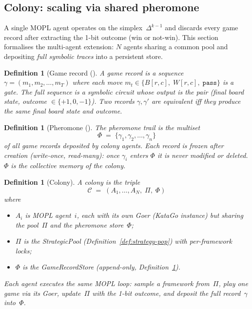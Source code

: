 \documentclass[11pt,a4paper]{article}
\newtheorem{definition}[theorem]{Definition}
\newcommand{\cC}{\mathcal{C}}
\begin{document}
\subsection{Colony: scaling via shared pheromone}\label{sec:colony}

A single MOPL agent operates on the simplex~$\Delta^{k-1}$
and discards every game record after extracting the 1-bit outcome
(win or not-win).
This section formalises the multi-agent extension:
$N$ agents sharing a common pool and depositing
\emph{full symbolic traces} into a persistent store.

\begin{definition}[Game record (\begin{CJK}{UTF8}{gbsn}棋谱\end{CJK})
  as symbolic circuit]\label{def:game-record}
A game record is a sequence
$\gamma = (m_1, m_2, \ldots, m_T)$
where each move $m_t \in \{B[r,c],\; W[r,c],\; \texttt{pass}\}$
is a \emph{gate}.
The full sequence is a symbolic circuit whose output
is the pair (final board state, outcome $\in \{+1, 0, -1\}$).
Two records $\gamma, \gamma'$ are \emph{equivalent} iff they
produce the same final board state and outcome.
\end{definition}

\begin{definition}[Pheromone
  (\begin{CJK}{UTF8}{gbsn}信息素\end{CJK})]\label{def:pheromone}
The pheromone trail is the multiset
\[
  \Phi \;=\; \{\gamma_1, \gamma_2, \ldots, \gamma_n\}
\]
of all game records deposited by colony agents.
Each record is \emph{frozen} after creation
(write-once, read-many):
once $\gamma_i$ enters $\Phi$ it is never modified or deleted.
$\Phi$ is the collective memory of the colony.
\end{definition}

\begin{definition}[Colony]\label{def:colony}
A colony is the triple
\[
  \cC \;=\; (A_1, \ldots, A_N,\; \Pi,\; \Phi)
\]
where
\begin{itemize}
\item $A_i$ is MOPL agent~$i$, each with its own Goer
      (KataGo instance) but sharing the pool~$\Pi$
      and the pheromone store~$\Phi$;
\item $\Pi$ is the StrategicPool
      (Definition~\ref{def:strategy-pop})
      with per-framework locks;
\item $\Phi$ is the GameRecordStore (append-only,
      Definition~\ref{def:pheromone}).
\end{itemize}
Each agent executes the same MOPL loop:
sample a framework from~$\Pi$, play one game via its Goer,
update~$\Pi$ with the 1-bit outcome,
and deposit the full record~$\gamma$ into~$\Phi$.
\end{definition}
\end{document}
